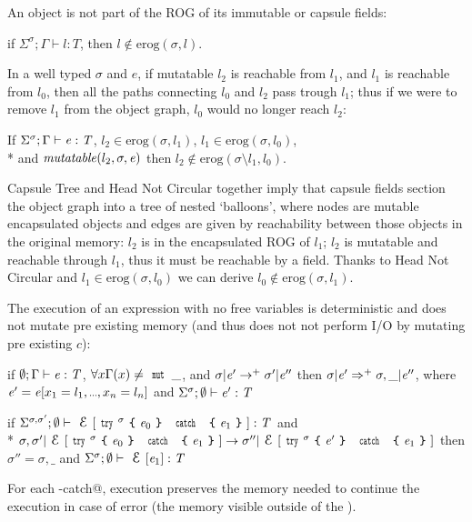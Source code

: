 \noindent An object is not part of the ROG of its immutable or capsule fields:\saveSpace\saveSpace
\begin{Assumption}
if
$\Sigma^\sigma;\Gamma\vdash l:T$,
then $l\notin\text{erog}(\sigma,l)$.
\end{Assumption}


\noindent In a well typed $\sigma$ and $e$, if mutatable $l_2$ is reachable from
$l_1$, and $l_1$ is reachable from $l_0$,
then all the paths connecting $l_0$ and $l_2$ pass trough $l_1$; thus
if we were to remove $l_1$ from the object graph, $l_0$ would no longer reach $l_2$:
\saveSpace\saveSpace
\begin{Assumption}
If   $\Sigma^\sigma;\Gamma\vdash {\ensuremath{\mathit{e}}}:{\mathit{T}}$,
$l_2\in\text{erog}(\sigma,l_1)$,
$l_1\in\text{erog}(\sigma,l_0)$,\\*
and
$\mathit{mutatable}(l_2,\sigma,{\mathit{e}})$
then 
$l_2\notin\text{erog}(\sigma\setminus l_1,l_0)$.
\end{Assumption}


Capsule Tree and Head Not Circular together 
imply that capsule fields section the object graph into a tree of nested `balloons',
where nodes are mutable encapsulated objects and
edges are given by reachability between those objects in the original memory:
$l_2$ is in the encapsulated ROG of $l_1$;
$l_2$ is mutatable and reachable through $l_1$, thus
it must be reachable by a \Q@capsule@ field.
Thanks to Head Not Circular and $l_1\in\text{erog}(\sigma,l_0)$ we can derive 
$l_0\notin\text{erog}(\sigma,l_1)$.

The execution of an expression
with no \Q@mut@ free variables is deterministic and does not
mutate pre existing memory (and thus does not not perform I/O by mutating pre existing $c$):
\begin{Assumption}[Determinism]
if $\emptyset;\Gamma\vdash {\ensuremath{\mathit{e}}}:{\mathit{T}}$, 
$\forall x \Gamma(x)\neq\Kw{mut}\,\_$, and
$\sigma | {\mathit{e}}'\rightarrow^+ \sigma' | {\mathit{e}}''$
then 
$\sigma | {\mathit{e}}'\Rightarrow^+ \sigma,\_ | {\mathit{e}}''$,
where $\e'=\e[x_1=l_1,\ldots,x_n=l_n]$ and $\Sigma^\sigma;\emptyset\vdash {\ensuremath{\mathit{e}}}':{\mathit{T}}$
\end{Assumption}

\begin{Assumption}[StrongExceptionSafety]
if $\Sigma^{\sigma,\sigma'};\emptyset\vdash \ctx[\Kw{try}^\sigma\oC\e_0\cC\ \Kw{catch}\ \oC\e_1\cC]:\T$
and\\*
$
\sigma,\sigma'|\ctx[\Kw{try}^\sigma\oC\e_0\cC\ \Kw{catch}\ \oC\e_1\cC]\rightarrow 
\sigma''|\ctx[\Kw{try}^\sigma\oC\e'\cC\ \Kw{catch}\ \oC\e_1\cC]
$
then 
$\sigma''=\sigma,\_$
and
$\Sigma^\sigma;\emptyset\vdash \ctx[\e_1]:\T$
\end{Assumption}
\noindent
For each \Q@try-catch@, execution preserves the memory needed to continue the execution in case of error
(the memory visible outside of the \Q@try@).%

